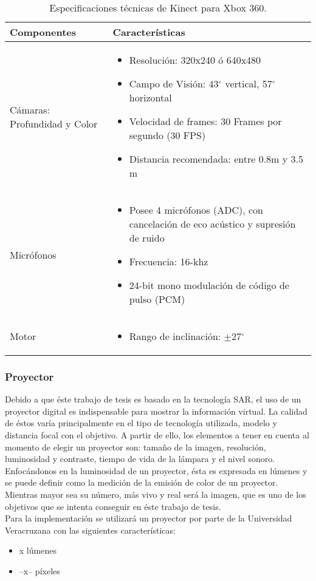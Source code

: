 \documentclass[a4paper,openright,12pt]{report}
\begin{document}
\begin{table}[H]
	\centering
	\begin{tabular}{>{\centering\arraybackslash}m{7cm} >{\arraybackslash}m{7cm} }
		\hline
		Componentes & Características\\
		\hline \hline
		Cámaras: Profundidad y Color
		&
\begin{itemize}
	\item Resolución: 320x240 ó 640x480
	\item Campo de Visión: 43$^{\circ}$ vertical, 57$^{\circ}$ horizontal
	\item Velocidad de frames: 30 Frames por segundo (30 FPS)
	\item Distancia recomendada: entre 0.8m y 3.5 m
\end{itemize}	
		\\
		\hline
		Micrófonos & 
		\begin{itemize}
			\item Posee 4 micrófonos (ADC), con cancelación de eco acústico y supresión de ruido
			\item Frecuencia: 16-khz
			\item 24-bit mono modulación de código de pulso (PCM)
		\end{itemize}
		 \\
		\hline
		Motor &
		\begin{itemize}
			\item  Rango de inclinación: $ \pm $27$^{\circ}$ 
		\end{itemize}\\
		\hline
	\end{tabular}
	\caption{Especificaciones técnicas de Kinect para Xbox 360.}
	\label{tabla:especKinect}
\end{table}
\subsubsection{Proyector}
Debido a que éste trabajo de tesis es basado en la tecnología SAR, el uso de un proyector digital es indispensable para mostrar la información virtual. La calidad de éstos varía principalmente en el tipo de tecnología utilizada, modelo y distancia focal con el objetivo. A partir de ello, los elementos a tener en cuenta al momento de elegir un proyector son: tamaño de la imagen, resolución, luminosidad y contraste, tiempo de vida de la lámpara y el nivel sonoro. Enfocándonos en la luminosidad de un proyector, ésta es expresada en lúmenes y se puede definir como la medición de la emisión de color de un proyector. Mientras mayor sea su número, más vivo y real será la imagen, que es uno de los objetivos que se intenta conseguir en éste trabajo de tesis.\\
Para la implementación se utilizará un proyector por parte de la Universidad Veracruzana con las siguientes características:
\begin{itemize}
	\item x lúmenes
	\item --x-- píxeles
\end{itemize}
\end{document}
